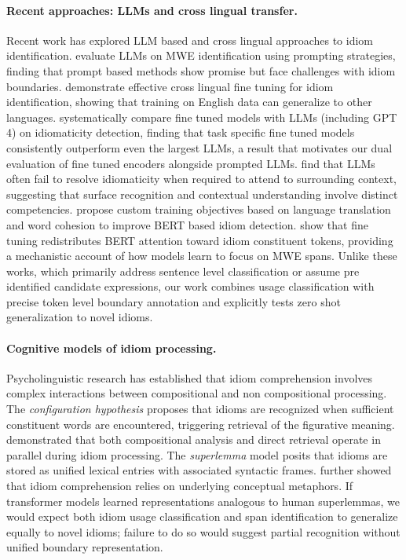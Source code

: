 \documentclass[11pt, a4paper]{report}
\begin{document}
\paragraph{Recent approaches: LLMs and cross lingual transfer.}
Recent work has explored LLM based and cross lingual approaches to idiom identification. \citet{hashiloni2025easypie} evaluate LLMs on MWE identification using prompting strategies, finding that prompt based methods show promise but face challenges with idiom boundaries. \citet{hefetz2025notjust} demonstrate effective cross lingual fine tuning for idiom identification, showing that training on English data can generalize to other languages. \citet{phelps2024sign} systematically compare fine tuned models with LLMs (including GPT 4) on idiomaticity detection, finding that task specific fine tuned models consistently outperform even the largest LLMs, a result that motivates our dual evaluation of fine tuned encoders alongside prompted LLMs. \citet{mi2024rolling} find that LLMs often fail to resolve idiomaticity when required to attend to surrounding context, suggesting that surface recognition and contextual understanding involve distinct competencies. \citet{yayavaram2024bert} propose custom training objectives based on language translation and word cohesion to improve BERT based idiom detection. \citet{zaitova2025attention} show that fine tuning redistributes BERT attention toward idiom constituent tokens, providing a mechanistic account of how models learn to focus on MWE spans. Unlike these works, which primarily address sentence level classification or assume pre identified candidate expressions, our work combines usage classification with precise token level boundary annotation and explicitly tests zero shot generalization to novel idioms.

\paragraph{Cognitive models of idiom processing.}
Psycholinguistic research has established that idiom comprehension involves complex interactions between compositional and non compositional processing. The \textit{configuration hypothesis} \citep{cacciari1988comprehension} proposes that idioms are recognized when sufficient constituent words are encountered, triggering retrieval of the figurative meaning. \citet{titone1999processing} demonstrated that both compositional analysis and direct retrieval operate in parallel during idiom processing. The \textit{superlemma} model \citep{sprenger2006lexical} posits that idioms are stored as unified lexical entries with associated syntactic frames. \citet{gibbs1990psycholinguistic} further showed that idiom comprehension relies on underlying conceptual metaphors. If transformer models learned representations analogous to human superlemmas, we would expect both idiom usage classification and span identification to generalize equally to novel idioms; failure to do so would suggest partial recognition without unified boundary representation.
\end{document}
